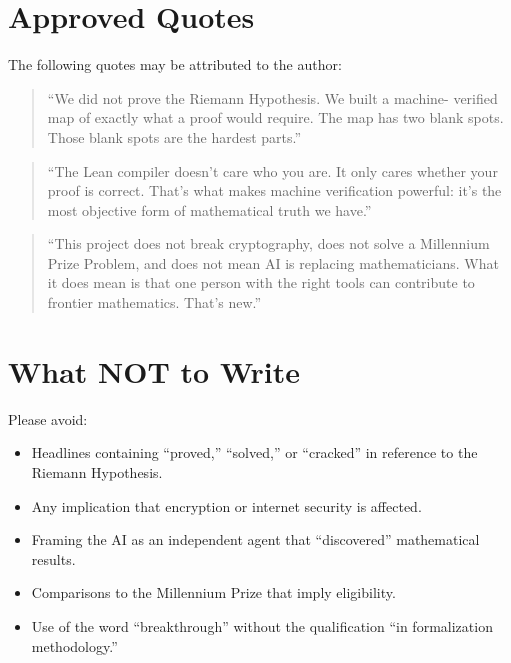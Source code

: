 \documentclass[11pt,a4paper]{article}
\begin{document}
\section{Approved Quotes}

The following quotes may be attributed to the author:

\begin{quote}
``We did not prove the Riemann Hypothesis. We built a machine-
verified map of exactly what a proof would require. The map has
two blank spots. Those blank spots are the hardest parts.''
\end{quote}

\begin{quote}
``The Lean compiler doesn't care who you are. It only cares
whether your proof is correct. That's what makes machine
verification powerful: it's the most objective form of
mathematical truth we have.''
\end{quote}

\begin{quote}
``This project does not break cryptography, does not solve a
Millennium Prize Problem, and does not mean AI is replacing
mathematicians. What it does mean is that one person with the
right tools can contribute to frontier mathematics. That's
new.''
\end{quote}

\section{What NOT to Write}

Please avoid:

\begin{itemize}
  \item Headlines containing ``proved,'' ``solved,'' or ``cracked''
    in reference to the Riemann Hypothesis.
  \item Any implication that encryption or internet security is
    affected.
  \item Framing the AI as an independent agent that ``discovered''
    mathematical results.
  \item Comparisons to the Millennium Prize that imply eligibility.
  \item Use of the word ``breakthrough'' without the qualification
    ``in formalization methodology.''
\end{itemize}
\end{document}
